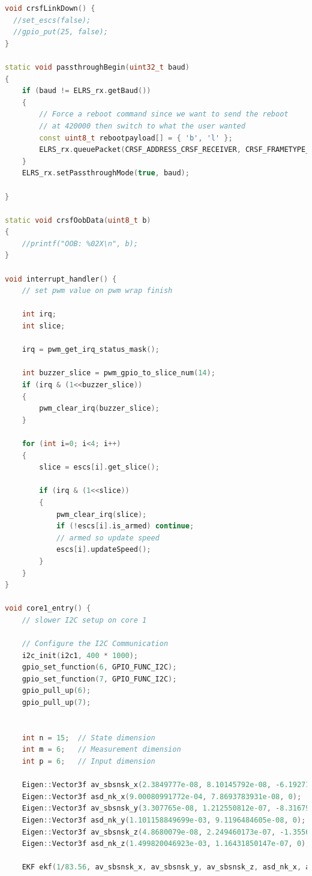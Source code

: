 \documentclass{article}
\begin{document}
\begin {lstlisting}[language=C++]
void crsfLinkDown() {
  //set_escs(false);
  //gpio_put(25, false);
}

static void passthroughBegin(uint32_t baud)
{
    if (baud != ELRS_rx.getBaud())
    {
        // Force a reboot command since we want to send the reboot
        // at 420000 then switch to what the user wanted
        const uint8_t rebootpayload[] = { 'b', 'l' };
        ELRS_rx.queuePacket(CRSF_ADDRESS_CRSF_RECEIVER, CRSF_FRAMETYPE_COMMAND, &rebootpayload, sizeof(rebootpayload));
    }
    ELRS_rx.setPassthroughMode(true, baud);
    
}

static void crsfOobData(uint8_t b)
{
    //printf("OOB: %
}

void interrupt_handler() {
    // set pwm value on pwm wrap finish

    int irq;
    int slice;

    irq = pwm_get_irq_status_mask();

    int buzzer_slice = pwm_gpio_to_slice_num(14);
    if (irq & (1<<buzzer_slice))
    {
        pwm_clear_irq(buzzer_slice);
    }

    for (int i=0; i<4; i++)
    {
        slice = escs[i].get_slice();

        if (irq & (1<<slice))
        {
            pwm_clear_irq(slice);
            if (!escs[i].is_armed) continue;
            // armed so update speed
            escs[i].updateSpeed();
        }
    }
}

void core1_entry() {
    // slower I2C setup on core 1

    // Configure the I2C Communication
    i2c_init(i2c1, 400 * 1000);
    gpio_set_function(6, GPIO_FUNC_I2C);
    gpio_set_function(7, GPIO_FUNC_I2C);
    gpio_pull_up(6);
    gpio_pull_up(7);


    int n = 15;  // State dimension
    int m = 6;   // Measurement dimension
    int p = 6;   // Input dimension
    
    Eigen::Vector3f av_sbsnsk_x(2.3849777e-08, 8.10145792e-08, -6.192712e-09);
    Eigen::Vector3f asd_nk_x(9.00080991772e-04, 7.8693783931e-08, 0);
    Eigen::Vector3f av_sbsnsk_y(3.307765e-08, 1.212550812e-07, -8.316799e-09);
    Eigen::Vector3f asd_nk_y(1.101158849699e-03, 9.1196484605e-08, 0);
    Eigen::Vector3f av_sbsnsk_z(4.8680079e-08, 2.249460173e-07, -1.3556376e-08);
    Eigen::Vector3f asd_nk_z(1.499820046923e-03, 1.16431850147e-07, 0);

    EKF ekf(1/83.56, av_sbsnsk_x, av_sbsnsk_y, av_sbsnsk_z, asd_nk_x, asd_nk_y, asd_nk_z);



\end{lstlisting}
\end{document}
